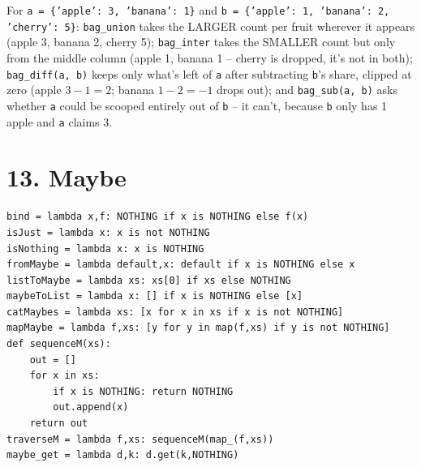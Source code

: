 \documentclass[10pt,letterpaper]{book}
\begin{document}
\begin{center}
\end{center}
For \texttt{a = \{'apple': 3, 'banana': 1\}} and \texttt{b = \{'apple': 1, 'banana': 2, 'cherry':
5\}}: \texttt{bag\_union} takes the LARGER count per fruit wherever it appears (apple 3, banana 2,
cherry 5); \texttt{bag\_inter} takes the SMALLER count but only from the middle column (apple 1,
banana 1 -- cherry is dropped, it's not in both); \texttt{bag\_diff(a, b)} keeps only what's left of
\texttt{a} after subtracting \texttt{b}'s share, clipped at zero (apple $3-1=2$; banana $1-2=-1$
drops out); and \texttt{bag\_sub(a, b)} asks whether \texttt{a} could be scooped entirely out of
\texttt{b} -- it can't, because \texttt{b} only has 1 apple and \texttt{a} claims 3.
\section*{13. Maybe}
\begin{lstlisting}[style=code]
bind = lambda x,f: NOTHING if x is NOTHING else f(x)
isJust = lambda x: x is not NOTHING
isNothing = lambda x: x is NOTHING
fromMaybe = lambda default,x: default if x is NOTHING else x
listToMaybe = lambda xs: xs[0] if xs else NOTHING
maybeToList = lambda x: [] if x is NOTHING else [x]
catMaybes = lambda xs: [x for x in xs if x is not NOTHING]
mapMaybe = lambda f,xs: [y for y in map(f,xs) if y is not NOTHING]
def sequenceM(xs):
    out = []
    for x in xs:
        if x is NOTHING: return NOTHING
        out.append(x)
    return out
traverseM = lambda f,xs: sequenceM(map_(f,xs))
maybe_get = lambda d,k: d.get(k,NOTHING)
\end{lstlisting}
\end{document}
